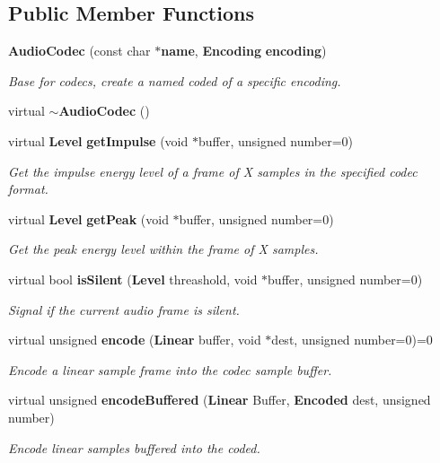 \subsection*{Public Member Functions}
\begin{DoxyCompactItemize}
\item 
{\bf AudioCodec} (const char $\ast${\bf name}, {\bf Encoding} {\bf encoding})
\begin{DoxyCompactList}\small\item\em Base for codecs, create a named coded of a specific encoding. \item\end{DoxyCompactList}\item 
virtual {\bf $\sim$AudioCodec} ()
\item 
virtual {\bf Level} {\bf getImpulse} (void $\ast$buffer, unsigned number=0)
\begin{DoxyCompactList}\small\item\em Get the impulse energy level of a frame of X samples in the specified codec format. \item\end{DoxyCompactList}\item 
virtual {\bf Level} {\bf getPeak} (void $\ast$buffer, unsigned number=0)
\begin{DoxyCompactList}\small\item\em Get the peak energy level within the frame of X samples. \item\end{DoxyCompactList}\item 
virtual bool {\bf isSilent} ({\bf Level} threashold, void $\ast$buffer, unsigned number=0)
\begin{DoxyCompactList}\small\item\em Signal if the current audio frame is silent. \item\end{DoxyCompactList}\item 
virtual unsigned {\bf encode} ({\bf Linear} buffer, void $\ast$dest, unsigned number=0)=0
\begin{DoxyCompactList}\small\item\em Encode a linear sample frame into the codec sample buffer. \item\end{DoxyCompactList}\item 
virtual unsigned {\bf encodeBuffered} ({\bf Linear} Buffer, {\bf Encoded} dest, unsigned number)
\begin{DoxyCompactList}\small\item\em Encode linear samples buffered into the coded. \item\end{DoxyCompactList}\item 

\end{DoxyCompactItemize}
